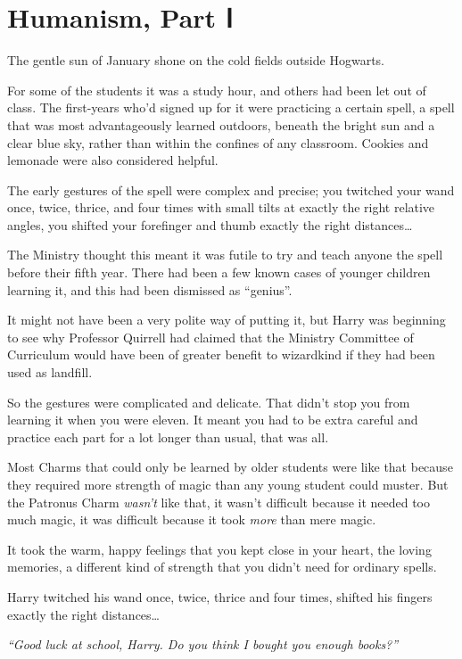 \chapter{Humanism, Part Ⅰ}\label{humanism-part}

The gentle sun of January shone on the cold fields outside Hogwarts.

For some of the students it was a study hour, and others had been let
out of class. The first-years who'd signed up for it were practicing a
certain spell, a spell that was most advantageously learned outdoors,
beneath the bright sun and a clear blue sky, rather than within the
confines of any classroom. Cookies and lemonade were also considered
helpful.

The early gestures of the spell were complex and precise; you twitched
your wand once, twice, thrice, and four times with small tilts at
exactly the right relative angles, you shifted your forefinger and thumb
exactly the right distances\ldots{}

The Ministry thought this meant it was futile to try and teach anyone
the spell before their fifth year. There had been a few known cases of
younger children learning it, and this had been dismissed as ``genius''.

It might not have been a very polite way of putting it, but Harry was
beginning to see why Professor Quirrell had claimed that the Ministry
Committee of Curriculum would have been of greater benefit to wizardkind
if they had been used as landfill.

So the gestures were complicated and delicate. That didn't stop you from
learning it when you were eleven. It meant you had to be extra careful
and practice each part for a lot longer than usual, that was all.

Most Charms that could only be learned by older students were like that
because they required more strength of magic than any young student
could muster. But the Patronus Charm \emph{wasn't} like that, it wasn't
difficult because it needed too much magic, it was difficult because it
took \emph{more} than mere magic.

It took the warm, happy feelings that you kept close in your heart, the
loving memories, a different kind of strength that you didn't need for
ordinary spells.

Harry twitched his wand once, twice, thrice and four times, shifted his
fingers exactly the right distances\ldots{}

\emph{``Good luck at school, Harry. Do you think I bought you enough
books?''}

